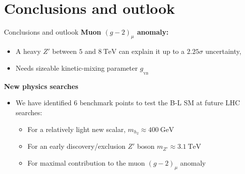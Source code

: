\documentclass[10pt,xcolor=dvipsnames,mathserif]{beamer}
\renewcommand{\(}{\left(}
\renewcommand{\)}{\right)}
\renewcommand{\[}{\left[}
\renewcommand{\]}{\right]}
\newcommand{\g}[2]{g_{_\mathrm{#1}}^{#2}}
\newcommand{\purple}[0]{\color{purple}}
\begin{document}
\section{Conclusions and outlook}

\begin{frame}{Conclusions and outlook}
	\textbf{\purple Muon $\(g-2\)_\mu$ anomaly:}
\begin{itemize}
	\item A heavy $Z'$ between $5$ and $8~\mathrm{TeV}$ can explain it up to a $2.25\sigma$ uncertainty,
	\item Needs sizeable kinetic-mixing parameter $\g{YB}{}$
\end{itemize}
\vskip2mm
	\textbf{\purple New physics searches}
\begin{itemize}
	\item We have identified 6 benchmark points to test the B-L SM at future LHC searches:
	\vskip2mm
	\begin{itemize}
		\item For a relatively light new scalar, $m_{h_2} \approx 400~\mathrm{GeV}$
		\vskip1mm
		\item For an early discovery/exclusion $Z'$ boson $m_{Z'} \approx 3.1~\mathrm{TeV}$
		\vskip1mm
		\item For maximal contribution to the muon $\(g-2\)_\mu$ anomaly
	\end{itemize} 
\end{itemize}
\end{frame}
\end{document}
